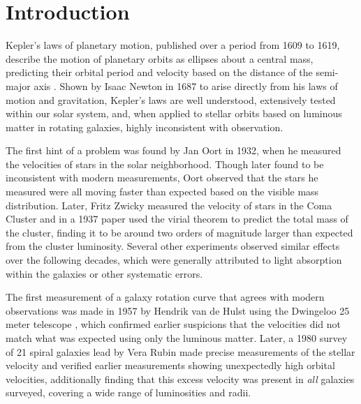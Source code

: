 \chapter{Introduction}
\label{intro_chapter}

Kepler's laws of planetary motion, published over a period from 1609 to 1619, describe the motion of planetary orbits as ellipses about a central mass, predicting their orbital period and velocity based on the distance of the semi-major axis \cite{kepler, russell}.
Shown by Isaac Newton in 1687 \cite{newton} to arise directly from his laws of motion and gravitation, Kepler's laws are well understood, extensively tested within our solar system, and, when applied to stellar orbits based on luminous matter in rotating galaxies, highly inconsistent with observation.

The first hint of a problem was found by Jan Oort in 1932, when he measured the velocities of stars in the solar neighborhood. 
Though later found to be inconsistent with modern measurements, Oort observed that the stars he measured were all moving faster than expected based on the visible mass distribution.
Later, Fritz Zwicky measured the velocity of stars in the Coma Cluster and in a 1937 paper \cite{Zwicky} used the virial theorem to predict the total mass of the cluster, finding it to be around two orders of magnitude larger than expected from the cluster luminosity. 
Several other experiments observed similar effects over the following decades, which were generally attributed to light absorption within the galaxies or other systematic errors.

The first measurement of a galaxy rotation curve that agrees with modern observations was made in 1957 by Hendrik van de Hulst using the Dwingeloo 25 meter telescope \cite{deHulst}, which confirmed earlier suspicions that the velocities did not match what was expected using only the luminous matter.
Later, a 1980 survey of 21 spiral galaxies lead by Vera Rubin \cite{RubinSurvey} made precise measurements of the stellar velocity and verified earlier measurements showing unexpectedly high orbital velocities, additionally finding that this excess velocity was present in \textit{all} galaxies surveyed, covering a wide range of luminosities and radii.

